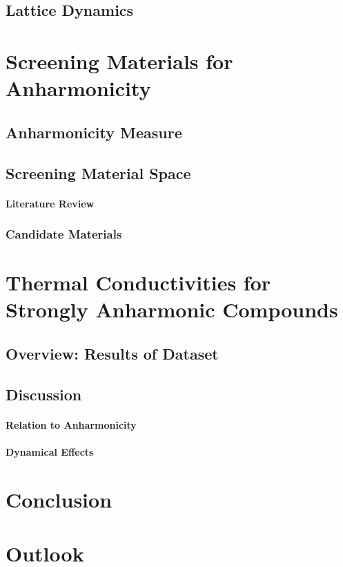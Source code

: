 \documentclass[a4paper,12pt]{book}
\begin{document}
\newpage

\section{Lattice Dynamics}


\chapter{Screening Materials for Anharmonicity}
\section{Anharmonicity Measure}
\section{Screening Material Space}
\subsubsection{Literature Review}
\subsection{Candidate Materials}

\chapter{Thermal Conductivities for Strongly Anharmonic Compounds}
\section{Overview: Results of Dataset}
\section{Discussion}
\subsubsection{Relation to Anharmonicity}
\subsubsection{Dynamical Effects}

\chapter{Conclusion}

\chapter{Outlook}




\appendix

\end{document}
